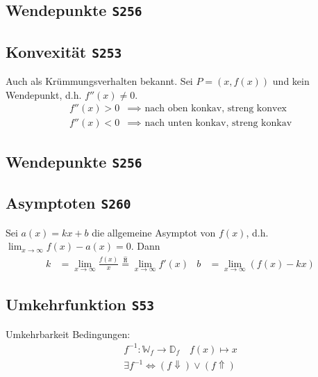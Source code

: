 \documentclass[a4paper, twocolumn]{article}
\newcommand{\heq}{\ensuremath{\stackrel{\hat{\texttt{H}}}{=}}}
\newcommand{\brpage}[1]{\textcolor{red!70!black}{\small\texttt{S#1}}}
\begin{document}
{\subsection{Wendepunkte \brpage{256}}
\subsection{Konvexit\"at \brpage{253}}
Auch als Kr\"ummungsverhalten bekannt. Sei \(P = (x,f(x))\) und kein Wendepunkt,
d.h. \(f''(x) \neq 0\).
\begin{align*}
  f''(x) > 0 & \implies \text{ nach oben konkav, streng konvex} \\
  f''(x) < 0 & \implies \text{ nach unten konkav, streng konkav}
\end{align*}

\subsection{Wendepunkte \brpage{256}}

\subsection{Asymptoten \brpage{260}}
Sei \(a(x) = kx + b\) die allgemeine Asymptot von \(f(x)\), d.h.
\(\lim_{x\to\infty} f(x) - a(x) = 0\). Dann
\begin{align*}
  k &= \lim_{x\to\infty}\frac{f(x)}{x} \heq \lim_{x\to\infty} f'(x)
  & b &= \lim_{x\to\infty}\left( f(x) - kx \right)
\end{align*}

\subsection{Umkehrfunktion \brpage{53}}
Umkehrbarkeit Bedingungen:
\begin{align*}
  f^{-1} : \mathbb{W}_f \to \mathbb{D}_f \quad f(x) \mapsto x \\
  \exists f^{-1} \iff (f\Downarrow)\vee(f\Uparrow)
\end{align*}

}
\end{document}
